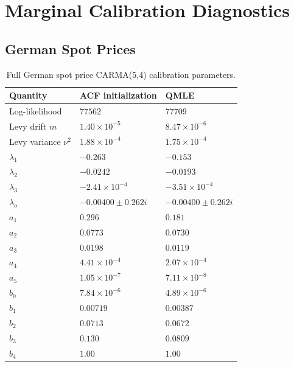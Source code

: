 \section{Marginal Calibration Diagnostics}

\label{app:marginal-calibration}



\subsection{German Spot Prices}

\label{app:price-calibration}

\begin{table}[H]
  \centering
  \caption{Full German spot price CARMA(5,4) calibration parameters.}
  \label{tab:app-price-carma-params}
  \small
  \begin{tabular}{@{}lll@{}}
    \toprule
    Quantity & ACF initialization & QMLE \\
    \midrule
    Log-likelihood & \(77562\) & \(77709\) \\
    Levy drift \(m\) & \(1.40{\times}10^{-5}\) & \(8.47{\times}10^{-6}\) \\
    Levy variance \(\nu^2\) & \(1.88{\times}10^{-4}\) & \(1.75{\times}10^{-4}\) \\
    \midrule
    \(\lambda_1\) & \(-0.263\) & \(-0.153\) \\
    \(\lambda_2\) & \(-0.0242\) & \(-0.0193\) \\
    \(\lambda_3\) & \(-2.41{\times}10^{-4}\) & \(-3.51{\times}10^{-4}\) \\
    \(\lambda_o\) & \(-0.00400\pm0.262i\) & \(-0.00400\pm0.262i\) \\
    \midrule
    \(a_1\) & \(0.296\) & \(0.181\) \\
    \(a_2\) & \(0.0773\) & \(0.0730\) \\
    \(a_3\) & \(0.0198\) & \(0.0119\) \\
    \(a_4\) & \(4.41{\times}10^{-4}\) & \(2.07{\times}10^{-4}\) \\
    \(a_5\) & \(1.05{\times}10^{-7}\) & \(7.11{\times}10^{-8}\) \\
    \midrule
    \(b_0\) & \(7.84{\times}10^{-6}\) & \(4.89{\times}10^{-6}\) \\
    \(b_1\) & \(0.00719\) & \(0.00387\) \\
    \(b_2\) & \(0.0713\) & \(0.0672\) \\
    \(b_3\) & \(0.130\) & \(0.0809\) \\
    \(b_4\) & \(1.00\) & \(1.00\) \\
    \bottomrule
  \end{tabular}
\end{table}



